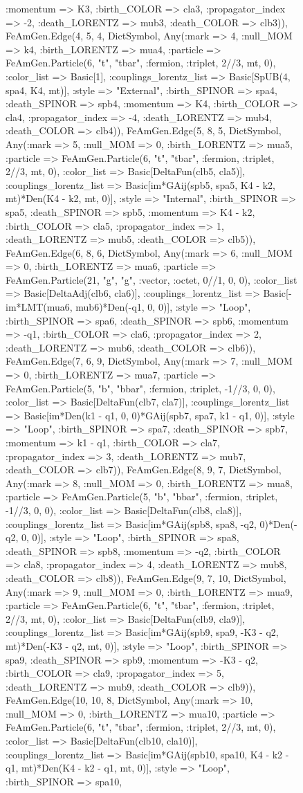 \documentclass{revtex4}
\begin{document}
\begin{figure}[!htb]
\begin{center}
{:momentum => K3, :birth_COLOR => cla3, :propagator_index => -2, :death_LORENTZ => mub3, :death_COLOR => clb3)), FeAmGen.Edge(4, 5, 4, Dict{Symbol, Any}(:mark => 4, :null_MOM => k4, :birth_LORENTZ => mua4, :particle => FeAmGen.Particle(6, "t", "tbar", :fermion, :triplet, 2//3, mt, 0), :color_list => Basic[1], :couplings_lorentz_list => Basic[SpUB(4, spa4, K4, mt)], :style => "External", :birth_SPINOR => spa4, :death_SPINOR => spb4, :momentum => K4, :birth_COLOR => cla4, :propagator_index => -4, :death_LORENTZ => mub4, :death_COLOR => clb4)), FeAmGen.Edge(5, 8, 5, Dict{Symbol, Any}(:mark => 5, :null_MOM => 0, :birth_LORENTZ => mua5, :particle => FeAmGen.Particle(6, "t", "tbar", :fermion, :triplet, 2//3, mt, 0), :color_list => Basic[DeltaFun(clb5, cla5)], :couplings_lorentz_list => Basic[im*GAij(spb5, spa5, K4 - k2, mt)*Den(K4 - k2, mt, 0)], :style => "Internal", :birth_SPINOR => spa5, :death_SPINOR => spb5, :momentum => K4 - k2, :birth_COLOR => cla5, :propagator_index => 1, :death_LORENTZ => mub5, :death_COLOR => clb5)), FeAmGen.Edge(6, 8, 6, Dict{Symbol, Any}(:mark => 6, :null_MOM => 0, :birth_LORENTZ => mua6, :particle => FeAmGen.Particle(21, "g", "g", :vector, :octet, 0//1, 0, 0), :color_list => Basic[DeltaAdj(clb6, cla6)], :couplings_lorentz_list => Basic[-im*LMT(mua6, mub6)*Den(-q1, 0, 0)], :style => "Loop", :birth_SPINOR => spa6, :death_SPINOR => spb6, :momentum => -q1, :birth_COLOR => cla6, :propagator_index => 2, :death_LORENTZ => mub6, :death_COLOR => clb6)), FeAmGen.Edge(7, 6, 9, Dict{Symbol, Any}(:mark => 7, :null_MOM => 0, :birth_LORENTZ => mua7, :particle => FeAmGen.Particle(5, "b", "bbar", :fermion, :triplet, -1//3, 0, 0), :color_list => Basic[DeltaFun(clb7, cla7)], :couplings_lorentz_list => Basic[im*Den(k1 - q1, 0, 0)*GAij(spb7, spa7, k1 - q1, 0)], :style => "Loop", :birth_SPINOR => spa7, :death_SPINOR => spb7, :momentum => k1 - q1, :birth_COLOR => cla7, :propagator_index => 3, :death_LORENTZ => mub7, :death_COLOR => clb7)), FeAmGen.Edge(8, 9, 7, Dict{Symbol, Any}(:mark => 8, :null_MOM => 0, :birth_LORENTZ => mua8, :particle => FeAmGen.Particle(5, "b", "bbar", :fermion, :triplet, -1//3, 0, 0), :color_list => Basic[DeltaFun(clb8, cla8)], :couplings_lorentz_list => Basic[im*GAij(spb8, spa8, -q2, 0)*Den(-q2, 0, 0)], :style => "Loop", :birth_SPINOR => spa8, :death_SPINOR => spb8, :momentum => -q2, :birth_COLOR => cla8, :propagator_index => 4, :death_LORENTZ => mub8, :death_COLOR => clb8)), FeAmGen.Edge(9, 7, 10, Dict{Symbol, Any}(:mark => 9, :null_MOM => 0, :birth_LORENTZ => mua9, :particle => FeAmGen.Particle(6, "t", "tbar", :fermion, :triplet, 2//3, mt, 0), :color_list => Basic[DeltaFun(clb9, cla9)], :couplings_lorentz_list => Basic[im*GAij(spb9, spa9, -K3 - q2, mt)*Den(-K3 - q2, mt, 0)], :style => "Loop", :birth_SPINOR => spa9, :death_SPINOR => spb9, :momentum => -K3 - q2, :birth_COLOR => cla9, :propagator_index => 5, :death_LORENTZ => mub9, :death_COLOR => clb9)), FeAmGen.Edge(10, 10, 8, Dict{Symbol, Any}(:mark => 10, :null_MOM => 0, :birth_LORENTZ => mua10, :particle => FeAmGen.Particle(6, "t", "tbar", :fermion, :triplet, 2//3, mt, 0), :color_list => Basic[DeltaFun(clb10, cla10)], :couplings_lorentz_list => Basic[im*GAij(spb10, spa10, K4 - k2 - q1, mt)*Den(K4 - k2 - q1, mt, 0)], :style => "Loop", :birth_SPINOR => spa10, }
\end{center}
\end{figure}
\end{document}
